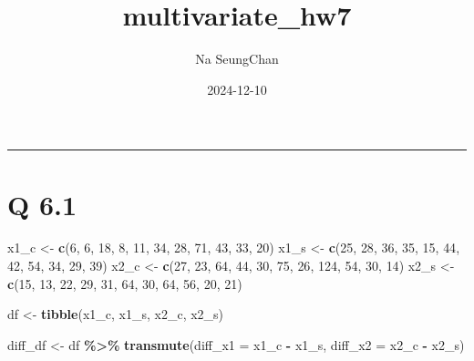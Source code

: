 \documentclass[
]{article}
\title{multivariate\_hw7}
\author{Na SeungChan}
\date{2024-12-10}
\newenvironment{Shaded}{\begin{snugshade}}{\end{snugshade}}
\newcommand{\AttributeTok}[1]{\textcolor[rgb]{0.13,0.29,0.53}{#1}}
\newcommand{\DecValTok}[1]{\textcolor[rgb]{0.00,0.00,0.81}{#1}}
\newcommand{\FunctionTok}[1]{\textcolor[rgb]{0.13,0.29,0.53}{\textbf{#1}}}
\newcommand{\NormalTok}[1]{#1}
\newcommand{\OtherTok}[1]{\textcolor[rgb]{0.56,0.35,0.01}{#1}}
\newcommand{\SpecialCharTok}[1]{\textcolor[rgb]{0.81,0.36,0.00}{\textbf{#1}}}
\begin{document}
\maketitle

\begin{center}\rule{0.5\linewidth}{0.5pt}\end{center}

\section{Q 6.1}\label{q-6.1}

\begin{Shaded}
\begin{Highlighting}[]
\NormalTok{x1\_c }\OtherTok{\textless{}{-}} \FunctionTok{c}\NormalTok{(}\DecValTok{6}\NormalTok{, }\DecValTok{6}\NormalTok{, }\DecValTok{18}\NormalTok{, }\DecValTok{8}\NormalTok{, }\DecValTok{11}\NormalTok{, }\DecValTok{34}\NormalTok{, }\DecValTok{28}\NormalTok{, }\DecValTok{71}\NormalTok{, }\DecValTok{43}\NormalTok{, }\DecValTok{33}\NormalTok{, }\DecValTok{20}\NormalTok{)}
\NormalTok{x1\_s }\OtherTok{\textless{}{-}} \FunctionTok{c}\NormalTok{(}\DecValTok{25}\NormalTok{, }\DecValTok{28}\NormalTok{, }\DecValTok{36}\NormalTok{, }\DecValTok{35}\NormalTok{, }\DecValTok{15}\NormalTok{, }\DecValTok{44}\NormalTok{, }\DecValTok{42}\NormalTok{, }\DecValTok{54}\NormalTok{, }\DecValTok{34}\NormalTok{, }\DecValTok{29}\NormalTok{, }\DecValTok{39}\NormalTok{)}
\NormalTok{x2\_c }\OtherTok{\textless{}{-}} \FunctionTok{c}\NormalTok{(}\DecValTok{27}\NormalTok{, }\DecValTok{23}\NormalTok{, }\DecValTok{64}\NormalTok{, }\DecValTok{44}\NormalTok{, }\DecValTok{30}\NormalTok{, }\DecValTok{75}\NormalTok{, }\DecValTok{26}\NormalTok{, }\DecValTok{124}\NormalTok{, }\DecValTok{54}\NormalTok{, }\DecValTok{30}\NormalTok{, }\DecValTok{14}\NormalTok{)}
\NormalTok{x2\_s }\OtherTok{\textless{}{-}} \FunctionTok{c}\NormalTok{(}\DecValTok{15}\NormalTok{, }\DecValTok{13}\NormalTok{, }\DecValTok{22}\NormalTok{, }\DecValTok{29}\NormalTok{, }\DecValTok{31}\NormalTok{, }\DecValTok{64}\NormalTok{, }\DecValTok{30}\NormalTok{, }\DecValTok{64}\NormalTok{, }\DecValTok{56}\NormalTok{, }\DecValTok{20}\NormalTok{, }\DecValTok{21}\NormalTok{)}

\NormalTok{df }\OtherTok{\textless{}{-}} \FunctionTok{tibble}\NormalTok{(x1\_c, x1\_s, x2\_c, x2\_s)}
\end{Highlighting}
\end{Shaded}

\begin{Shaded}
\begin{Highlighting}[]
\NormalTok{diff\_df }\OtherTok{\textless{}{-}}\NormalTok{ df }\SpecialCharTok{\%\textgreater{}\%} 
  \FunctionTok{transmute}\NormalTok{(}\AttributeTok{diff\_x1 =}\NormalTok{ x1\_c }\SpecialCharTok{{-}}\NormalTok{ x1\_s, }\AttributeTok{diff\_x2 =}\NormalTok{ x2\_c }\SpecialCharTok{{-}}\NormalTok{ x2\_s)}
\end{Highlighting}
\end{Shaded}
\end{document}
